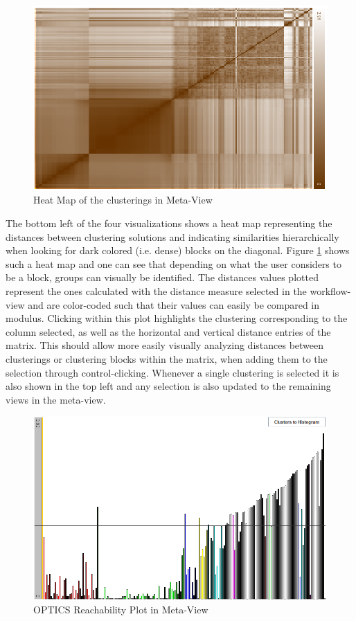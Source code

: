 \documentclass[
	a4paper,
	english,
	twoside,
	openright,               
	11pt                            
	]{report}
\begin{document}
\begin{figure}[h]
	\centering
	\includegraphics[scale=.45]{heat-map}
	\caption{Heat Map of the clusterings in Meta-View}
	\label{fig:heatmap}
\end{figure}

The bottom left of the four visualizations shows a heat map representing the distances between clustering solutions and indicating similarities hierarchically when looking for dark colored (i.e. dense) blocks on the diagonal. Figure \ref{fig:heatmap} shows such a heat map and one can see that depending on what the user considers to be a block, groups can visually be identified. The distances values plotted represent the ones calculated with the distance measure selected in the workflow-view and are color-coded such that their values can easily be compared in modulus. Clicking within this plot highlights the clustering corresponding to the column selected, as well as the horizontal and vertical distance entries of the matrix. This should allow more easily visually analyzing distances between clusterings or clustering blocks within the matrix, when adding them to the selection through control-clicking. Whenever a single clustering is selected it is also shown in the top left and any selection is also updated to the remaining views in the meta-view.

\begin{figure}[h]
	\centering
	\includegraphics[scale=.45]{reach-plot}
	\caption{OPTICS Reachability Plot in Meta-View }
	\label{fig:opticsplot}
\end{figure}
\end{document}
